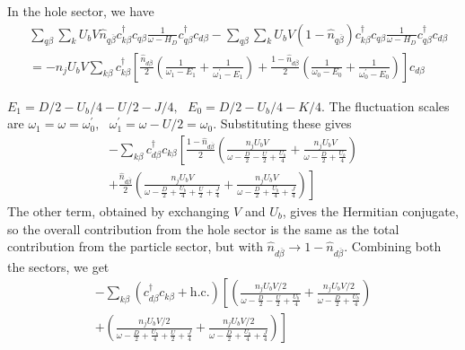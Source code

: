 \documentclass[reprint,superscriptaddress,floatfix]{revtex4-2}
\begin{document}
\begin{widetext}
In the hole sector, we have
\begin{equation}\begin{aligned}
	&\sum_{q\beta}\sum_{k}U_b V \hat n_{q\overline\beta} c^\dagger_{k\beta}c_{q\beta} \frac{1}{\omega - H_D} c^\dagger_{q\beta}c_{d\beta} -\sum_{q\beta}\sum_{k}U_b V \left(1 - \hat n_{q\overline\beta}\right) c^\dagger_{k\beta}c_{q\beta} \frac{1}{\omega - H_D} c^\dagger_{q\beta}c_{d\beta}\\
	&= -n_jU_b V\sum_{k\beta} c^\dagger_{k\beta} \left[\frac{\hat n_{d\overline\beta}}{2}\left(\frac{1}{\omega_1 - E_1} + \frac{1}{\omega^\prime_1 - E_1}\right) + \frac{1-\hat n_{d\overline\beta}}{2}\left(\frac{1}{\omega_0 - E_0} + \frac{1}{\omega_0^\prime - E_0}\right)\right] c_{d\beta}
\end{aligned}\end{equation}
\end{widetext}
\(E_1 = D/2 - U_b/4 - U/2 - J/4,~ ~ ~ E_0 = D/2 - U_b/4 - K/4\). The fluctuation scales are \(\omega_1 = \omega = \omega_0^\prime,~ ~ ~ \omega_1^\prime = \omega - U/2 = \omega_0\). Substituting these gives
\begin{equation}\begin{aligned}
	-\sum_{k\beta} c^\dagger_{d\beta} c_{k\beta} \left[\frac{1 - \hat n_{d\overline\beta}}{2}\left(\frac{n_jU_b V}{\omega - \frac{D}{2} - \frac{U}{2} + \frac{U_b}{4}} + \frac{n_jU_b V}{\omega - \frac{D}{2} + \frac{U_b}{4}}\right)\right.\\
	+ \left.\frac{\hat n_{d\overline\beta}}{2}\left(\frac{n_jU_b V}{\omega - \frac{D}{2} + \frac{U_b}{4} + \frac{U}{2} + \frac{J}{4}} + \frac{n_jU_b V}{\omega - \frac{D}{2} + \frac{U_b}{4} + \frac{J}{4}}\right)\right]
\end{aligned}\end{equation}
The other term, obtained by exchanging \(V\) and \(U_b\), gives the Hermitian conjugate, so the overall contribution from the hole sector is the same as the total contribution from the particle sector, but with \(\hat n_{d\overline\beta} \to 1 - \hat n_{d\overline\beta}\). Combining both the sectors, we get
\begin{equation}\begin{aligned}
	-\sum_{k\beta} \left(c^\dagger_{d\beta} c_{k\beta} + \text{h.c.}\right) \left[\left(\frac{n_jU_b V/2}{\omega - \frac{D}{2} - \frac{U}{2} + \frac{U_b}{4}} + \frac{n_jU_b V/2}{\omega - \frac{D}{2} + \frac{U_b}{4}}\right) \right.\\
	+ \left.\left(\frac{n_jU_b V/2}{\omega - \frac{D}{2} + \frac{U_b}{4} + \frac{U}{2} + \frac{J}{4}} + \frac{n_jU_b V/2}{\omega - \frac{D}{2} + \frac{U_b}{4} + \frac{J}{4}}\right)\right]
\end{aligned}\end{equation}
\end{document}
